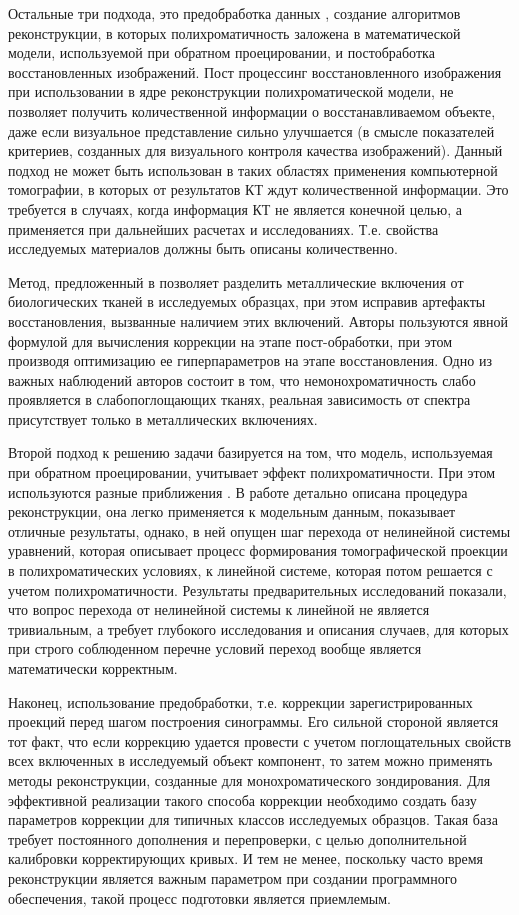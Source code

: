 Остальные три подхода, это предобработка данных \cite{dewulf2012sense}, создание алгоритмов реконструкции, в которых полихроматичность заложена в математической модели, используемой при обратном проецировании, и постобработка восстановленных изображений. 
Пост процессинг восстановленного изображения \cite{krumm2008reducing} при использовании в ядре реконструкции полихроматической модели, не позволяет получить количественной информации о восстанавливаемом объекте, даже если визуальное представление сильно улучшается (в смысле показателей критериев, созданных для визуального контроля качества изображений).
Данный подход не может быть использован в таких областях применения компьютерной томографии, в которых от результатов КТ ждут количественной информации.
Это требуется в случаях, когда информация КТ не является конечной целью, а применяется при дальнейших расчетах и исследованиях.
Т.е. свойства исследуемых материалов должны быть описаны количественно.

Метод, предложенный в \cite{park2016metal} позволяет разделить металлические включения от биологических тканей в исследуемых образцах, при этом исправив артефакты восстановления, вызванные наличием этих включений.
Авторы пользуются явной формулой для вычисления коррекции на этапе пост-обработки, при этом производя оптимизацию ее гиперпараметров на этапе восстановления.
Одно из важных наблюдений авторов состоит в том, что немонохроматичность слабо проявляется в слабопоглощающих тканях, реальная зависимость от спектра присутствует только в металлических включениях.

Второй подход к решению задачи базируется на том, что модель, используемая при обратном проецировании, учитывает эффект полихроматичности.
При этом используются разные приближения \cite{stenner2010dynamic, van2011iterative}.
В работе \cite{brabant2012novel} детально описана процедура реконструкции, она легко применяется к модельным данным, показывает отличные результаты, однако, в ней опущен шаг перехода от нелинейной системы уравнений, которая описывает процесс формирования томографической проекции в полихроматических условиях, к линейной системе, которая потом решается с учетом полихроматичности.
Результаты предварительных исследований показали, что вопрос перехода от нелинейной системы к линейной не является тривиальным, а требует глубокого исследования и описания случаев, для которых при строго соблюденном перечне условий переход вообще является математически корректным.

Наконец, использование предобработки, т.е. коррекции зарегистрированных проекций перед шагом построения синограммы.
Его сильной стороной является тот факт, что если коррекцию удается провести с учетом поглощательных свойств всех включенных в исследуемый объект компонент, то затем можно применять методы реконструкции, созданные для монохроматического зондирования.
Для эффективной реализации такого способа коррекции необходимо создать базу параметров коррекции для типичных классов исследуемых образцов.
Такая база требует постоянного дополнения и перепроверки, с целью дополнительной калибровки корректирующих кривых.
И тем не менее, поскольку часто время реконструкции является важным параметром при создании программного обеспечения, такой процесс подготовки является приемлемым.